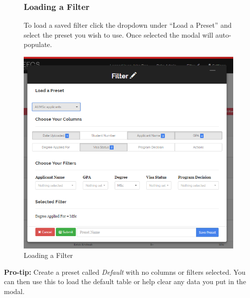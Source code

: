 \documentclass[fontsize=12pt,paper=letter,twoside]{scrartcl}
\begin{document}
\begin{figure}[!htb]
\subsubsection{Loading a Filter}
To load a saved filter click the dropdown under ``Load a Preset'' and select the preset you wish to use. Once selected the modal will auto-populate.

\begin{center}
\includegraphics[width=.99\textwidth]{images/ma/load_preset.png}
\end{center}
\caption{Loading a Filter}
\label{fig:save_filter}
\end{figure}

\smallskip
\noindent \textbf{Pro-tip:} Create a preset called \emph{Default} with no columns or filters selected. You can then use this to load the default table or help clear any data you put in the modal.
\end{document}
